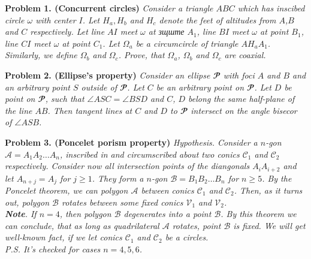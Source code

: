 \documentclass[12pt]{extarticle}
\renewcommand{\P}{\mathbfcal{P}}
\newcommand{\C}{\mathcal{C}}
\newcommand{\V}{\mathcal{V}}
\begin{document}
\textbf{Problem 1. (Concurrent circles)}
\textit{
Consider a triangle \(ABC\) which has inscibed circle \(\omega\) with 
center \(I\). 
Let \(H_a, H_b\) and \(H_c\) denote the feet
of altitudes from \(A\),\(B\) and \(C\) respectively. Let 
line \(AI\) meet \(\omega\) at зщште \(A_1\),
line \(BI\) meet \(\omega\) at point \(B_1\),
line \(CI\) meet \(\omega\) at point \(C_1\).
Let \(\Omega_a\) be a circumcircle of triangle \(AH_aA_1\). 
Similarly, we define \(\Omega_b\) and \(\Omega_c\).
Prove, that \(\Omega_a\), \(\Omega_b\) and \(\Omega_c\) are coaxial.\\
}

\textbf{Problem 2. (Ellipse's property)}
\textit{
Consider an ellipse \(\P\) with foci \(A\) and \(B\) and an arbitrary 
point \(S\) outside of \(\P\). Let \(C\) be an arbitrary point on 
\(\P\). Let \(D\) be point on \(\P\), such that \(\angle ASC = \angle BSD\) and \(C\), \(D\) belong the same half-plane of the line \(AB\). 
Then tangent lines at \(C\) and \(D\) to \(\P\) intersect on the 
angle bisecor of \(\angle ASB\).\\
}
 


\textbf{Problem 3. (Poncelet porism property)}
\textit{
Hypothesis. Consider a \(n\)-gon \(\mathcal{A}=A_1A_2…A_n\), inscribed in and 
circumscribed about two conics \(\C_1\) and \(\C_2\) respectively.
Consider now all intersection points of the diangonals 
\(A_iA_{i+2}\) and let \(A_{n+j} = A_j\) for \(j \geqslant 1\). 
They form a \(n\)-gon \(\mathcal{B}=B_1B_2…B_n\) for \(n \geqslant 5\).
By the Poncelet theorem, we can  polygon 
\(\mathcal{A}\) between conics \(\C_1\) and \(\C_2\). 
Then, as it turns out, polygon \(\mathcal{B}\) rotates between some 
fixed conics \(\V_1\) and \(\V_2\).\\
\indent \textbf{Note}. If \(n = 4\), then polygon \(\mathcal{B}\) 
degenerates into a point \(\mathscr{B}\). By this theorem we can conclude, 
that as long as quadrilateral \(\mathcal{A}\) rotates, 
point \(\mathscr{B}\) is fixed. We will get well-known fact, if we let 
conics \(\C_1\) and \(\C_2\) be a circles.\\
\indent P.S. It's checked for cases \(n = 4,5,6\).\\
}
\end{document}
